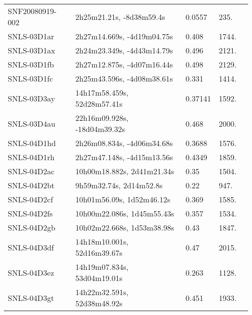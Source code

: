 \begin{longtable}{lllll}
  SNF20080919-002 &       2h25m21.21s, -8d38m59.4s &   0.0557 &           235. &    \citet{2003SDSS1.C...0000:} \\
      SNLS-03D1ar &     2h27m14.669s, -4d19m04.75s &    0.408 &          1744. &  \citet{2009AandA...507...85B} \\
      SNLS-03D1ax &     2h24m23.349s, -4d43m14.79s &    0.496 &          2121. &    \citet{2005ApJ...634.1190H} \\
      SNLS-03D1fb &     2h27m12.875s, -4d07m16.44s &    0.498 &          2129. &  \citet{2006AandA...447...31A} \\
      SNLS-03D1fc &     2h25m43.596s, -4d08m38.61s &    0.331 &          1414. &  \citet{2006AandA...447...31A} \\
      SNLS-03D3ay &    14h17m58.459s, 52d28m57.41s &  0.37141 &          1592. &    \citet{2007DEEP2.3...0000:} \\
      SNLS-03D4au &   22h16m09.928s, -18d04m39.32s &    0.468 &          2000. &  \citet{2006AandA...447...31A} \\
      SNLS-04D1hd &     2h26m08.834s, -4d06m34.68s &   0.3688 &          1576. &    \citet{2008ApJ...674...51E} \\
      SNLS-04D1rh &     2h27m47.148s, -4d15m13.56s &   0.4349 &          1859. &    \citet{2008ApJ...674...51E} \\
      SNLS-04D2ac &     10h00m18.882s, 2d41m21.34s &     0.35 &          1504. &    \citet{2007ApJS..172...99C} \\
      SNLS-04D2bt &        9h59m32.74s, 2d14m52.8s &     0.22 &           947. &  \citet{2006AandA...447...31A} \\
      SNLS-04D2cf &      10h01m56.09s, 1d52m46.12s &    0.369 &          1585. &  \citet{2006AandA...447...31A} \\
      SNLS-04D2fs &     10h00m22.086s, 1d45m55.43s &    0.357 &          1534. &  \citet{2006AandA...447...31A} \\
      SNLS-04D2gb &     10h02m22.668s, 1d53m38.98s &     0.43 &          1847. &  \citet{2006AandA...447...31A} \\
      SNLS-04D3df &    14h18m10.001s, 52d16m39.67s &     0.47 &          2015. &  \citet{2006AandA...447...31A} \\
      SNLS-04D3ez &    14h19m07.834s, 53d04m19.01s &    0.263 &          1128. &    \citet{2008ApJ...674...51E} \\
      SNLS-04D3gt &    14h22m32.591s, 52d38m48.92s &    0.451 &          1933. &  \citet{2006AandA...447...31A} \\

\end{longtable}
